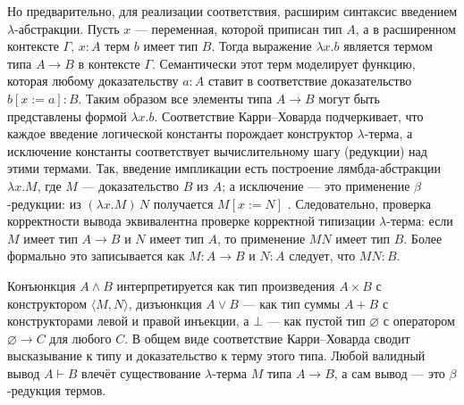 \documentclass[14pt]{extarticle}
\begin{document}
	Но предварительно, для реализации соответствия, расширим синтаксис введением \(\lambda\)-абстракции. Пусть \(x\) — переменная, которой приписан тип \(A\), а в расширенном контексте \(\Gamma,\,x:A\) терм \(b\) имеет тип \(B\). Тогда выражение \(\lambda x.b\) является термом типа \(A\to B\) в контексте \(\Gamma\). Семантически этот терм моделирует функцию, которая любому доказательству \(a:A\) ставит в соответствие доказательство \(b[x:=a]:B\). Таким образом все элементы типа \(A\to B\) могут быть представлены формой \(\lambda x.b\).
	Соответствие Карри–Ховарда подчеркивает, что каждое введение логической константы порождает конструктор \(\lambda\)-терма, а исключение константы соответствует вычислительному шагу (редукции) над этими термами. Так, введение импликации есть построение лямбда-абстракции \(\lambda x.M\), где \(M\) — доказательство \(B\) из \(A\); а исключение — это применение \(\beta\)-редукции: из \((\lambda x.M)\,N\) получается \(M[x:=N]\) \cite[46]{ershov_celishev2012}. Следовательно, проверка корректности вывода эквивалентна проверке корректной типизации \(\lambda\)-терма: если \(M\) имеет тип \(A\to B\) и \(N\) имеет тип \(A\), то применение \(MN\) имеет тип \(B\). Более формально это записывается как \(M : A \to B\) и \(N : A\) следует, что \(MN : B\). 
	
	Конъюнкция \(A\wedge B\) интерпретируется как тип произведения \(A\times B\) с конструктором \(\langle M,N\rangle\), дизъюнкция \(A\vee B\) — как тип суммы \(A + B\) с конструкторами левой и правой инъекции, а \(\bot\) — как пустой тип \(\varnothing\) с оператором \(\varnothing\to C\) для любого \(C\). В общем виде соответствие Карри–Ховарда сводит высказывание к типу и доказательство к терму этого типа. Любой валидный вывод \(A\vdash B\) влечёт существование \(\lambda\)-терма \(M\) типа \(A\to B\), а сам вывод — это \(\beta\)-редукция термов.	
	
\end{document}
